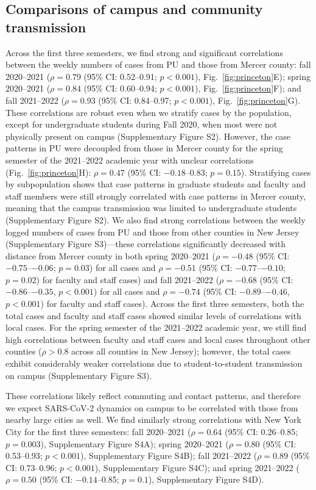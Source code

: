 \documentclass[12pt]{article}
\newcommand{\fref}[1]{Fig.~\ref{fig:#1}}
\begin{document}
\subsection*{Comparisons of campus and community transmission}

Across the first three semesters, we find strong and significant correlations between the weekly numbers of cases from PU and those from Mercer county:
fall 2020--2021 ($\rho = 0.79$ (95\% CI: 0.52--0.91; $p < 0.001$), \fref{princeton}E); spring 2020--2021 ($\rho = 0.84$ (95\% CI: 0.60--0.94; $p < 0.001$), \fref{princeton}F); and fall 2021--2022 ($\rho = 0.93$ (95\% CI: 0.84--0.97; $p < 0.001$), \fref{princeton}G). 
These correlations are robust even when we stratify cases by the population, except for undergraduate students during Fall 2020, when most were not physically present on campus (Supplementary Figure S2).
However, the case patterns in PU were decoupled from those in Mercer county for the spring semester of the 2021--2022 academic year with unclear correlations (\fref{princeton}H): $\rho = 0.47$ (95\% CI: $-0.18$--0.83; $p = 0.15$).
Stratifying cases by subpopulation shows that case patterns in graduate students and faculty and staff members were still strongly correlated with case patterns in Mercer county, meaning that the campus transmission was limited to undergraduate students (Supplementary Figure S2). 
We also find strong correlations between the weekly logged numbers of cases from PU and those from other counties in New Jersey (Supplementary Figure S3)---these correlations significantly decreased with distance from Mercer county in both spring 2020--2021 ($\rho=-0.48$ (95\% CI: $-0.75$--$-0.06$; $p = 0.03$) for all cases and $\rho=-0.51$ (95\% CI: $-0.77$--$-0.10$; $p = 0.02$) for faculty and staff cases) and fall 2021--2022 ($\rho=-0.68$ (95\% CI: $-0.86$--$-0.35$, $p < 0.001$) for all cases and $\rho=-0.74$ (95\% CI: $-0.89$--$-0.46$, $p < 0.001$) for faculty and staff cases).
Across the first three semesters, both the total cases and faculty and staff cases showed similar levels of correlations with local cases.
For the spring semester of the 2021--2022 academic year, we still find high correlations between faculty and staff cases and local cases throughout other counties ($\rho > 0.8$ across all counties in New Jersey); however, the total cases exhibit considerably weaker correlations due to student-to-student transmission on campus (Supplementary Figure S3).    

These correlations likely reflect commuting and contact patterns, and therefore we expect SARS-CoV-2 dynamics on campus to be correlated with those from nearby large cities as well. 
We find similarly strong correlations with New York City for the first three semesters: fall 2020--2021 ($\rho = 0.64$ (95\% CI: 0.26--0.85; $p = 0.003$), Supplementary Figure S4A); spring 2020--2021 ($\rho = 0.80$ (95\% CI: 0.53--0.93; $p < 0.001$), Supplementary Figure S4B); fall 2021--2022 ($\rho = 0.89$ (95\% CI: 0.73--0.96; $p < 0.001$), Supplementary Figure S4C); and spring 2021--2022 ($\rho = 0.50$ (95\% CI: $-0.14$--0.85; $p=0.1$), Supplementary Figure S4D).
\end{document}
